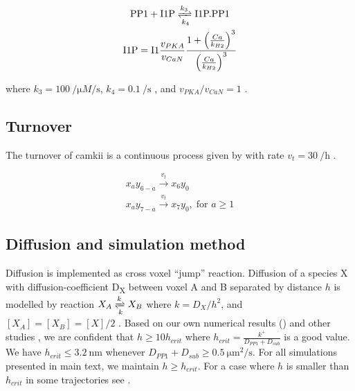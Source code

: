 \documentclass[9pt,lineno,doublespacing]{elife}
\newcommand\SUB[2]{#1\textsubscript{#2}}
\begin{document}
{\begin{equation}\label{eq:i1pandpp1}
    \begin{gathered}
        \text{PP1} + \text{I1P} \xrightleftharpoons[k_4]{k_3} \text{I1P.PP1} \\
        \text{I1P} = \text{I1} \frac{v_{PKA}}{v_{CaN}} 
            \frac{1+\left(\frac{Ca}{k_{H2}}\right)^3}{\left(\frac{Ca}{k_{H2}}\right)^3}
    \end{gathered}
\end{equation}

\noindent where $k_3=\SI{100}{\per\micro M\per\second}$,
$k_4=\SI{0.1}{\per\second}$ \citep{endo_multiple_1996}, and $v_{PKA}/v_{CaN}=1$
\citep{miller_stability_2005}.

\subsection{Turnover}\label{turnover}

The turnover of \gls{camkii} is a continuous process given by  with rate
$v_{t}=\SI{30}{\per\hour}$ \citep{ehlers_activity_2003}.

\begin{equation} \label{eq:turnover}
    \begin{gathered}
        x_ay_{6-a} \xrightarrow{v_t} x_6y_0 \\
        x_ay_{7-a} \xrightarrow{v_t} x_7y_0,\; \text{for } a \ge 1
    \end{gathered}
\end{equation}

\subsection{Diffusion and simulation method}\label{subsec:simulator}

Diffusion is implemented as cross voxel ``jump'' reaction. Diffusion of a
species X with diffusion-coefficient \SUB{D}{X} between voxel A and B separated
by distance $h$ is modelled by reaction $X_A \xrightleftharpoons[k]{k} X_B$
where \( k={D_X}/{h^2}\), and \([X_A]=[X_B]=[X]/2 \)
\citep{erban_practical_2007}.  Based on our own numerical results () and
other studies \citep{isaacson_reaction-diffusion_2009,erban_stochastic_2009}, we
are confident that \( h \ge 10h_{crit}\) where
\(h_{crit}=\frac{k^+}{D_{PP1}+D_{sub}}\) is a good value.  We have \( h_{crit} \le \SI{3.2}{\nano\meter} \)
whenever $D_{PP1}+D_{sub}\ge\SI{0.5}{\micro\meter\squared\per\second}$. For all
simulations presented in main text, we maintain $h\ge h_{crit}$.  For a case
where $h$ is smaller than $h_{crit}$ in some trajectories see
. 

}
\end{document}
